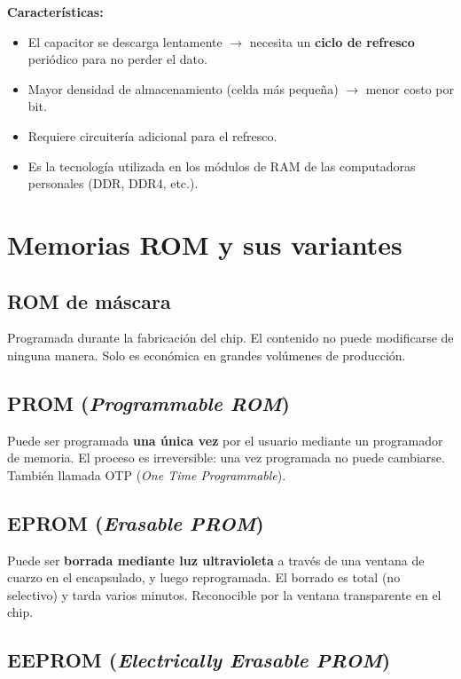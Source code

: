 \textbf{Características:}
\begin{itemize}
  \item El capacitor se descarga lentamente $\rightarrow$ necesita un \textbf{ciclo de refresco} periódico para no perder el dato.
  \item Mayor densidad de almacenamiento (celda más pequeña) $\rightarrow$ menor costo por bit.
  \item Requiere circuitería adicional para el refresco.
  \item Es la tecnología utilizada en los módulos de RAM de las computadoras personales (DDR, DDR4, etc.).
\end{itemize}

\section{Memorias ROM y sus variantes}

\subsection{ROM de máscara}

Programada durante la fabricación del chip. El contenido no puede modificarse de ninguna manera. Solo es económica en grandes volúmenes de producción.

\subsection{PROM (\textit{Programmable ROM})}

Puede ser programada \textbf{una única vez} por el usuario mediante un programador de memoria. El proceso es irreversible: una vez programada no puede cambiarse. También llamada OTP (\textit{One Time Programmable}).

\subsection{EPROM (\textit{Erasable PROM})}

Puede ser \textbf{borrada mediante luz ultravioleta} a través de una ventana de cuarzo en el encapsulado, y luego reprogramada. El borrado es total (no selectivo) y tarda varios minutos. Reconocible por la ventana transparente en el chip.


\subsection{EEPROM (\textit{Electrically Erasable PROM})}

